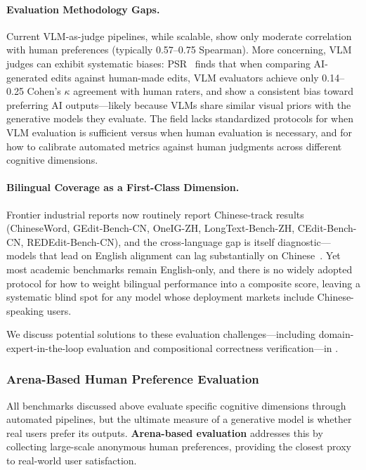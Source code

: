 \documentclass{llmxive}
\begin{document}
\paragraph{Evaluation Methodology Gaps.} Current VLM-as-judge pipelines, while scalable, show only moderate correlation with human preferences (typically 0.57--0.75 Spearman). More concerning, VLM judges can exhibit systematic biases: PSR~\citep{taesiri2025understanding} finds that when comparing AI-generated edits against human-made edits, VLM evaluators achieve only 0.14--0.25 Cohen's $\kappa$ agreement with human raters, and show a consistent bias toward preferring AI outputs---likely because VLMs share similar visual priors with the generative models they evaluate. The field lacks standardized protocols for when VLM evaluation is sufficient versus when human evaluation is necessary, and for how to calibrate automated metrics against human judgments across different cognitive dimensions.

\paragraph{Bilingual Coverage as a First-Class Dimension.} Frontier industrial reports now routinely report Chinese-track results (ChineseWord, GEdit-Bench-CN, OneIG-ZH, LongText-Bench-ZH, CEdit-Bench-CN, REDEdit-Bench-CN), and the cross-language gap is itself diagnostic---models that lead on English alignment can lag substantially on Chinese~\citep{wu2025qwen, team2025longcat, team2026firered}. Yet most academic benchmarks remain English-only, and there is no widely adopted protocol for how to weight bilingual performance into a composite score, leaving a systematic blind spot for any model whose deployment markets include Chinese-speaking users.

We discuss potential solutions to these evaluation challenges---including domain-expert-in-the-loop evaluation and compositional correctness verification---in .


\subsubsection{Arena-Based Human Preference Evaluation}
\label{subsubsec:arena}

All benchmarks discussed above evaluate specific cognitive dimensions through automated pipelines, but the ultimate measure of a generative model is whether real users prefer its outputs. \textbf{Arena-based evaluation} addresses this by collecting large-scale anonymous human preferences, providing the closest proxy to real-world user satisfaction.
\end{document}
